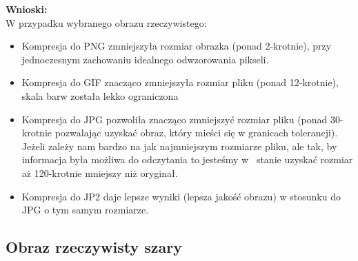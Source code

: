 \documentclass[a4paper, 12pt]{article}
\begin{document}
\textbf{Wnioski:} \\
W przypadku wybranego obrazu rzeczywistego:
\begin{itemize}
\setlength\itemsep{-0.2cm}
  \item Kompresja do PNG zmniejszyła rozmiar obrazka (ponad 2-krotnie), przy jednoczesnym 
  zachowaniu idealnego odwzorowania pikseli. 
  \item Kompresja do GIF znacząco zmniejszyła rozmiar pliku (ponad 12-krotnie),
   skala barw została lekko ograniczona
   \item Kompresja do JPG pozwoliła znacząco zmniejszyć rozmiar pliku (ponad 30-krotnie
   pozwalając uzyskać obraz, który mieści się w granicach tolerancji). Jeżeli zależy nam bardzo
   na jak najmniejszym rozmiarze pliku, ale tak, by informacja była możliwa do odczytania to jesteśmy
   w~ stanie uzyskać rozmiar aż 120-krotnie mniejszy niż oryginał.
   \item Kompresja do JP2 daje lepsze wyniki (lepsza jakość obrazu) w stosunku do JPG o tym samym rozmiarze.
\end{itemize}

\subsection{Obraz rzeczywisty szary}
\end{document}
